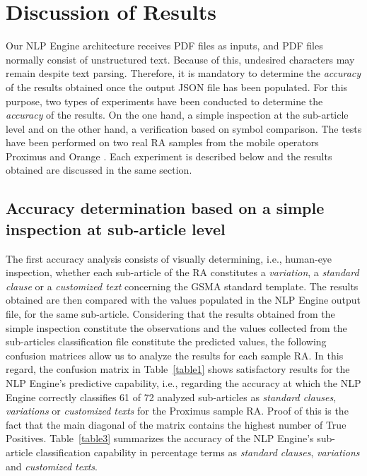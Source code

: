 \section{Discussion of Results}\label{results}
Our NLP Engine architecture receives PDF files as inputs, and PDF files normally consist of unstructured text. Because of this, undesired characters may remain despite text parsing. Therefore, it is mandatory to determine the \textit{accuracy} of the results obtained once the output JSON file has been populated. For this purpose, two types of experiments have been conducted to determine the \textit{accuracy} of the results. On the one hand, a simple inspection at the sub-article level and on the other hand, a verification based on symbol comparison. The tests have been performed on two real RA samples from the mobile operators Proximus and Orange \cite{proximus}. Each experiment is described below and the results obtained are discussed in the same section.

\subsection{Accuracy determination based on a simple inspection at sub-article level}
The first accuracy analysis consists of visually determining, i.e., human-eye inspection, whether each sub-article of the RA constitutes a \textit{variation}, a \textit{standard clause} or a \textit{customized text} concerning the GSMA standard template. The results obtained are then compared with the values populated in the NLP Engine output file, for the same sub-article. Considering that the results obtained from the simple inspection constitute the observations and the values collected from the sub-articles classification file constitute the predicted values, the following confusion matrices allow us to analyze the results for each sample RA. In this regard, the confusion matrix in Table~\ref{table1}  shows satisfactory results for the NLP Engine's predictive capability, i.e., regarding the accuracy at which the NLP Engine correctly classifies 61 of 72 analyzed sub-articles as \textit{standard clauses}, \textit{variations} or \textit{customized texts} for the Proximus sample RA. Proof of this is the fact that the main diagonal of the matrix contains the highest number of True Positives. Table~\ref{table3} summarizes the accuracy of the NLP Engine's sub-article classification capability in percentage terms as \textit{standard clauses}, \textit{variations} and \textit{customized texts}.


